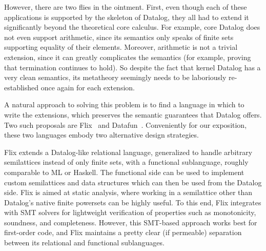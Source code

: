 However, there are two flies in the ointment. First, even though each
of these applications is supported by the skeleton of Datalog, they
all had to extend it significantly beyond the theoretical core
calculus.  For example, core Datalog does not even support arithmetic,
since its semantics only speaks of finite sets supporting equality of
their elements. Moreover, arithmetic is not a trivial extension, since
it can greatly complicates the semantics (for example, proving that
termination continues to hold). So despite the fact that kernel
Datalog has a very clean semantics, its metatheory seemingly needs to
be laboriously re-established once again for each extension.

A natural approach to solving this problem is to find a language in which to
write the extensions, which preserves the semantic guarantees that Datalog
offers. Two such proposals are Flix~\cite{flix} and Datafun~\cite{datafun}.
Conveniently for our exposition, these two languages embody two alternative
design strategies.

%
%
%
%
%
%
%

Flix extends a Datalog-like relational language, generalized to handle arbitrary
semilattices instead of only finite sets, with a functional sublanguage, roughly
comparable to ML or Haskell. The functional side can be used to implement custom
semilattices and data structures which can then be used from the Datalog side.
Flix is aimed at static analysis, where working in a semilattice other than
Datalog's native finite powersets can be highly useful. To this end, Flix
integrates with SMT solvers for lightweight verification of properties such as
monotonicity, soundness, and completeness. However, this SMT-based approach
works best for first-order code, and Flix maintains a pretty clear (if
permeable) separation between its relational and functional sublanguages.

